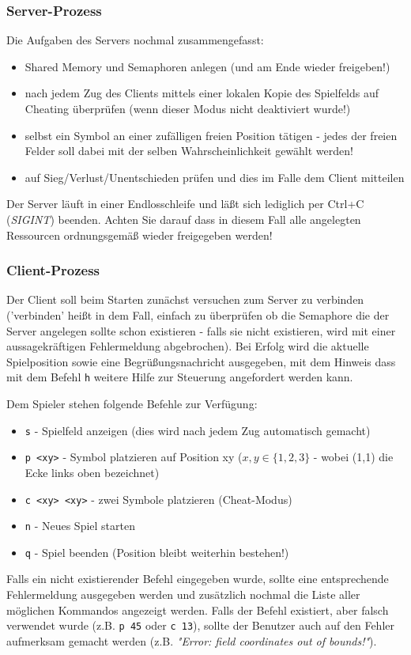 \documentclass{article}
\begin{document}
\subsubsection*{Server-Prozess}
Die Aufgaben des Servers nochmal zusammengefasst:
\begin{itemize}
\item Shared Memory und Semaphoren anlegen (und am Ende wieder freigeben!)
\item nach jedem Zug des Clients mittels einer lokalen Kopie des Spielfelds auf Cheating überprüfen (wenn
  dieser Modus nicht deaktiviert wurde!)
\item selbst ein Symbol an einer zufälligen freien Position tätigen - jedes der freien Felder soll dabei
      mit der selben Wahrscheinlichkeit gewählt werden!
\item auf Sieg/Verlust/Unentschieden prüfen und dies im Falle dem Client mitteilen
\end{itemize}
Der Server läuft in einer Endlosschleife und läßt sich lediglich per
Ctrl+C (\textit{SIGINT}) beenden. Achten Sie darauf dass in diesem Fall
alle angelegten Ressourcen ordnungsgemäß wieder freigegeben werden!

\subsubsection*{Client-Prozess}
Der Client soll beim Starten zunächst versuchen zum Server zu verbinden
('verbinden' heißt in dem Fall, einfach zu überprüfen ob die Semaphore
die der Server angelegen sollte schon existieren - falls sie nicht existieren,
wird mit einer aussagekräftigen Fehlermeldung abgebrochen). Bei Erfolg wird die aktuelle
Spielposition sowie eine
Begrüßungsnachricht ausgegeben, mit dem Hinweis dass mit dem Befehl \texttt{h}
weitere Hilfe zur Steuerung angefordert werden kann.

Dem Spieler stehen folgende Befehle zur Verfügung:
\begin{itemize}
	\item \texttt{s} - Spielfeld anzeigen (dies wird nach jedem Zug automatisch gemacht)
	\item \texttt{p <xy>} - Symbol platzieren auf Position xy ($ x,y \in \{1,2,3\} $ - wobei (1,1) die Ecke links oben bezeichnet)
	\item \texttt{c <xy> <xy>} - zwei Symbole platzieren (Cheat-Modus)
	\item \texttt{n} - Neues Spiel starten
	\item \texttt{q} - Spiel beenden (Position bleibt weiterhin bestehen!)
\end{itemize}
Falls ein nicht existierender Befehl eingegeben wurde, sollte eine entsprechende
Fehlermeldung ausgegeben werden und zusätzlich nochmal die Liste aller möglichen
Kommandos angezeigt werden. Falls der Befehl existiert, aber falsch verwendet wurde
(z.B. \texttt{p 45} oder \texttt{c 13}), sollte der Benutzer auch auf den Fehler
aufmerksam gemacht werden (z.B. \textit{"Error: field coordinates out of bounds!"}).
\end{document}
